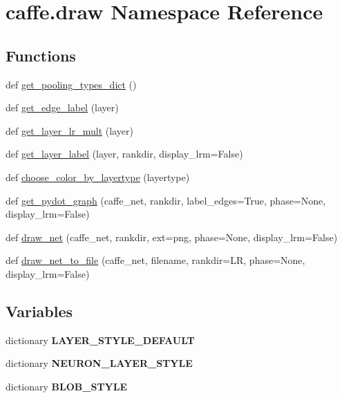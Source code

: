 \hypertarget{namespacecaffe_1_1draw}{}\section{caffe.\+draw Namespace Reference}
\label{namespacecaffe_1_1draw}
\subsection*{Functions}
\begin{DoxyCompactItemize}
\item 
def \mbox{\hyperlink{namespacecaffe_1_1draw_a18df1acb5bad222d90e8873375367ef1}{get\+\_\+pooling\+\_\+types\+\_\+dict}} ()
\item 
def \mbox{\hyperlink{namespacecaffe_1_1draw_a672545af1643af2c11e6b19226eaf6c4}{get\+\_\+edge\+\_\+label}} (layer)
\item 
def \mbox{\hyperlink{namespacecaffe_1_1draw_ac1df68579f91acefee36f75ac5b0de1d}{get\+\_\+layer\+\_\+lr\+\_\+mult}} (layer)
\item 
def \mbox{\hyperlink{namespacecaffe_1_1draw_a1ab4383ec4e16ed4e8f0e027c25c682a}{get\+\_\+layer\+\_\+label}} (layer, rankdir, display\+\_\+lrm=False)
\item 
def \mbox{\hyperlink{namespacecaffe_1_1draw_ab06e25fd2bbb0166d3c3ff19d9854828}{choose\+\_\+color\+\_\+by\+\_\+layertype}} (layertype)
\item 
def \mbox{\hyperlink{namespacecaffe_1_1draw_a679642bc8af6fb5382480cfad0c27111}{get\+\_\+pydot\+\_\+graph}} (caffe\+\_\+net, rankdir, label\+\_\+edges=True, phase=None, display\+\_\+lrm=False)
\item 
def \mbox{\hyperlink{namespacecaffe_1_1draw_af1c2f41e9d66bae6814590e8c59f64c6}{draw\+\_\+net}} (caffe\+\_\+net, rankdir, ext=\textquotesingle{}png\textquotesingle{}, phase=None, display\+\_\+lrm=False)
\item 
def \mbox{\hyperlink{namespacecaffe_1_1draw_a1955d119b9b325ea2ad20254b3dc80e3}{draw\+\_\+net\+\_\+to\+\_\+file}} (caffe\+\_\+net, filename, rankdir=\textquotesingle{}LR\textquotesingle{}, phase=None, display\+\_\+lrm=False)
\end{DoxyCompactItemize}
\subsection*{Variables}
\begin{DoxyCompactItemize}
\item 
dictionary {\bfseries L\+A\+Y\+E\+R\+\_\+\+S\+T\+Y\+L\+E\+\_\+\+D\+E\+F\+A\+U\+LT}
\item 
dictionary {\bfseries N\+E\+U\+R\+O\+N\+\_\+\+L\+A\+Y\+E\+R\+\_\+\+S\+T\+Y\+LE}
\item 
dictionary {\bfseries B\+L\+O\+B\+\_\+\+S\+T\+Y\+LE}
\end{DoxyCompactItemize}


